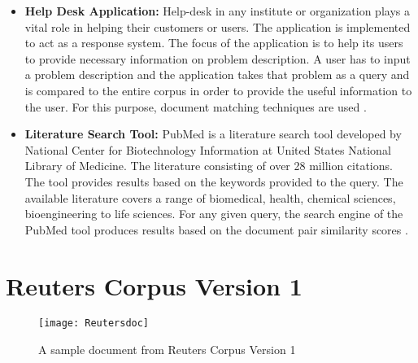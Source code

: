 \begin{itemize}
\item \textbf{Help Desk Application:} Help-desk in any institute or organization plays a vital role in helping their customers or users. The application is implemented to act as a response system. The focus of the application is to help its users to provide necessary information on problem description. A user has to input a problem description and the application takes that problem as a query and is compared to the entire corpus in order to provide the useful information to the user. For this purpose, document matching techniques are used \cite{weiss2000lightweight}.

\item \textbf{Literature Search Tool:} PubMed is a literature search tool developed by National Center for Biotechnology Information at United States National Library of Medicine. The literature consisting of over 28 million citations. The tool provides results based on the keywords provided to the query. The available literature covers a range of biomedical, health, chemical sciences, bioengineering to life sciences. For any given query, the search engine of the PubMed tool produces results based on the document pair similarity scores \cite{website:pubmed}. 
\end{itemize}


\newpage
\section{Reuters Corpus Version 1}
\label{section: rcv1}

\begin{figure}[hp]
	\centering
		\texttt{[image: Reutersdoc]}
	\caption{A sample document from Reuters Corpus Version 1 \cite{lewis2004rcv1}}
	\label{fig:reutersdoc}
\end{figure}

